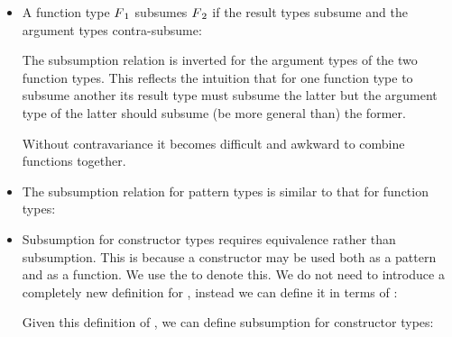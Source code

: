 \begin{itemize}

\item A function type $F\sub1$ subsumes $F\sub2$ if the result types subsume and the argument types contra-subsume:

\begin{prooftree}
\end{prooftree}

The subsumption relation is inverted for the argument types of the two function types. This reflects the intuition that for one function type to subsume another its result type must subsume the latter but the argument type of the latter should subsume (be more general than) the former.
\begin{aside}
Without contravariance it becomes difficult and awkward to combine functions together. 
\end{aside}

\item The subsumption relation for pattern types is similar to that for function types:
\begin{prooftree}
\end{prooftree}

\item Subsumption for constructor types requires equivalence rather than subsumption. This is because a constructor may be used both as a pattern and as a function. We use the \equivt{} to denote this. We do not need to introduce a completely new definition for \equivt{}, instead we can define it in terms of \subsume:

\begin{prooftree}
\end{prooftree}

Given this definition of \equivt{}, we can define subsumption for constructor types:
\begin{prooftree}
\end{prooftree}


\end{itemize}
